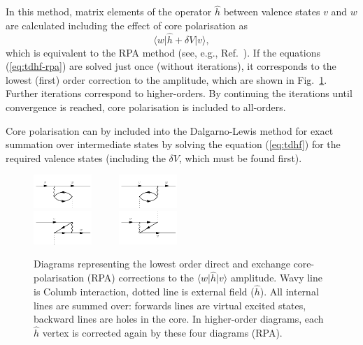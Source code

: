 \documentclass[10pt,twocolumn,a4paper]{article}%
\newcommand{\bra}[1]{\ensuremath{\langle #1|}}	%
\newcommand{\ket}[1]{\ensuremath{|#1\rangle}}	%
\newcommand{\be}{\begin{equation}}
\newcommand{\ee}{\end{equation}}
\begin{document}
In this method, matrix elements of the operator $\hat h$ between valence states $v$ and $w$ are calculated including the effect of core polarisation as~\cite{DzubaHFS1984}
\be
\bra{w}\hat h + \delta V\ket{v},
\ee
which is equivalent to the RPA method (see, e.g., Ref.~\cite{JohnsonBook2007}).
If the equations (\ref{eq:tdhf-rpa}) are solved just once (without iterations), it corresponds to the lowest (first) order correction to the amplitude, which are shown in Fig.~\ref{fig:corePol}.
Further iterations correspond to higher-orders.
By continuing the iterations until convergence is reached, core polarisation is included to all-orders.


Core polarisation can by included into the Dalgarno-Lewis  method for exact summation over intermediate states by solving the equation (\ref{eq:tdhf}) for the required valence states (including the $\delta V$, which must be found first).



\begin{figure}%
\centering
\includegraphics[width=0.195\textwidth]{img/tdhf/meth-CP-direct2}~~~~~
\includegraphics[width=0.195\textwidth]{img/tdhf/meth-CP-direct1}\\
\includegraphics[width=0.195\textwidth]{img/tdhf/meth-CP-exchange1}~~~~~
\includegraphics[width=0.195\textwidth]{img/tdhf/meth-CP-exchange2}
\caption{\small Diagrams representing the lowest order direct and exchange core-polarisation (RPA) corrections to the $\bra{w}\hat h\ket{v}$ amplitude.
Wavy line is Columb interaction, dotted line is external field ($\hat h$). All internal lines are summed over: forwards lines are virtual excited states, backward lines are holes in the core.
In higher-order diagrams, each $\hat h$ vertex is corrected again by these four diagrams (RPA).\label{fig:corePol}}
\end{figure}
\end{document}
